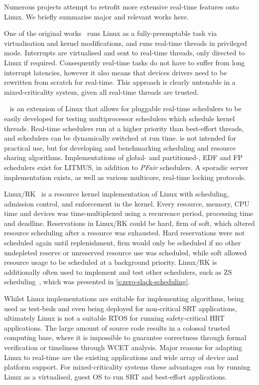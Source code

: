 Numerous projects attempt to retrofit more extensive real-time features onto
Linux.  We briefly summarise major and relevant works here. 

One of the original
works~\citep{Yodaiken_Barabanov_97} runs Linux as a fully-preemptable task via virtualisation and
kernel modifications, and runs real-time threads in privileged mode. Interrupts are virtualised and
sent to real-time threads, only directed to
Linux if required. Consequently real-time tasks do not have to suffer from long interrupt
latencies, however it also means that devices drivers need to be rewritten from scratch for
real-time. This approach is clearly untenable in a mixed-criticality system, given all real-time
threads are trusted. 

\litmus~\citep{Calandrino_LBDA_07} is an extension of Linux that allows for pluggable real-time
schedulers to be easily developed for testing multiprocessor schedulers which schedule kernel
threads. Real-time schedulers run at a higher priority than best-effort threads, and schedulers can
be dynamically switched at run time. \litmus is not intended for
practical use, but for developing and benchmarking scheduling and resource sharing algorithms.
Implementations of global- and partitioned-, EDF and FP schedulers exist for LITMUS, in addition to
\emph{PFair} schedulers. A sporadic server implementation exists, as well as various multicore,
real-time locking protocols.

Linux/RK~\citep{Oikawa_Rajkumar_98} is a resource kernel implementation of Linux with scheduling,
admission control, and enforcement in the kernel. Every resource, memory, CPU time and devices was
time-multiplexed using a recurrence period, processing time and deadline. Reservations in Linux/RK
could be hard, firm of soft, which altered resource scheduling after a resource was exhausted. Hard
reservations were not scheduled again until replenishment, firm would only be scheduled if no other
undepleted reserve or unreserved resource use was scheduled, while soft allowed resource usage to be
scheduled at a background priority. Linux/RK is additionally often used to implement and test other
schedulers, such as \Gls{ZS} scheduling~\citep{deNiz_LR_09}, which was presented in
\cref{s:zero-slack-scheduling}.
 
Whilst Linux implementations are suitable for implementing algorithms, being used as test-beds and
even being deployed for non-critical \gls{SRT} applications, ultimately Linux is not a suitable
\gls{RTOS} for running safety-critical \gls{HRT} applications. The large amount of source code
results in a colossal trusted computing base, where it is impossible to guarantee correctness through
formal verification or timeliness through {\gls{WCET}} analysis.  Major reasons for adapting Linux
to real-time are the existing applications and wide array of device and platform support. For
mixed-criticality systems these advantages can by running Linux as a virtualised, guest \gls{OS} to run \gls{SRT}
and best-effort applications.

